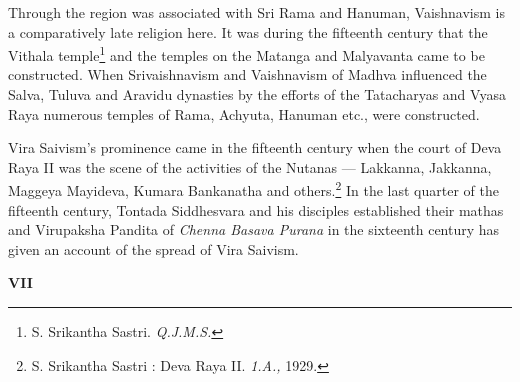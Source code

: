 \documentclass{book}
\begin{document}
Through the region was associated with Sri Rama and Hanuman, Vaishnavism is a comparatively late religion here. It was during the fifteenth century that the Vithala temple\footnote[19]{S. Srikantha Sastri. {\em Q.J.M.S.}} and the temples on the Matanga and Malyavanta came to be constructed. When Srivaishnavism and Vaishnavism of Madhva influenced the Salva, Tuluva and Aravidu dynasties by the efforts of the Tatacharyas and Vyasa Raya numerous temples of Rama, Achyuta, Hanuman etc., were constructed. 

Vira Saivism's prominence came in the fifteenth century when the court of Deva Raya II was the scene of the activities of the Nutanas --- Lakkanna, Jakkanna, Maggeya Mayideva, Kumara Bankanatha and others.\footnote[21]{S. Srikantha Sastri : Deva Raya II. {\em 1.A.,} 1929.} In the last quarter of the fifteenth century, Tontada Siddhesvara and his disciples established their mathas and Virupaksha Pandita of {\em Chenna Basava Purana} in the sixteenth century has given an account of the spread of Vira Saivism.

\medskip
\begin{center}
{\bf VII}
\end{center}
\smallskip
\end{document}
